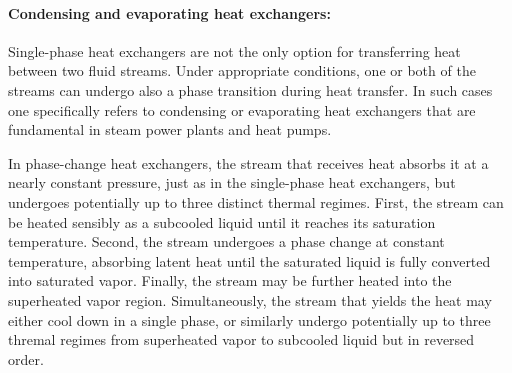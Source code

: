 \begin{example}
\begin{center}
    \end{center}
\end{example}

\paragraph{Condensing and evaporating heat exchangers:} Single-phase heat exchangers are not the only option for transferring heat between two fluid streams. Under appropriate conditions, one or both of the streams can undergo also a phase transition during heat transfer. In such cases one specifically refers to condensing or evaporating heat exchangers that are fundamental in steam power plants and heat pumps.

In phase-change heat exchangers, the stream that receives heat absorbs it at a nearly constant pressure, just as in the single-phase heat exchangers, but undergoes potentially up to three distinct thermal regimes. First, the stream can be heated sensibly as a subcooled liquid until it reaches its saturation temperature. Second, the stream undergoes a phase change at constant temperature, absorbing latent heat until the saturated liquid is fully converted into saturated vapor. Finally, the stream may be further heated into the superheated vapor region. Simultaneously, the stream that yields the heat may either cool down in a single phase, or similarly undergo potentially up to three thremal regimes from superheated vapor to subcooled liquid but in reversed order. 

